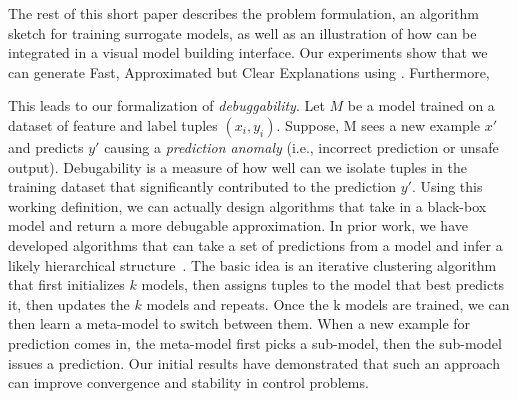 The rest of this short paper describes the \sys problem formulation, an algorithm sketch for training surrogate models, as well as an illustration of how \sys can be integrated in a visual model building interface.
Our experiments show that we can generate Fast, Approximated but Clear Explanations using \sys.
Furthermore, 


This leads to our formalization of \emph{debuggability}.
Let $M$ be a model trained on a dataset of feature and label tuples $(x_i,y_i)$.
Suppose, M sees a new example $x'$ and predicts $y'$ causing a \emph{prediction anomaly} (i.e., incorrect prediction or unsafe output).
Debugability is a measure of how well can we isolate tuples in the training dataset that significantly contributed to the prediction $y'$.
Using this working definition, we can actually design algorithms that take in a black-box model and return a more debugable approximation.
In prior work, we have developed algorithms that can take a set of predictions from a model and infer a likely hierarchical structure~\cite{DBLP:journals/corr/KrishnanGLMPG16, Krishnan17}.
The basic idea is an iterative clustering algorithm that first initializes $k$ models, then assigns tuples to the model that best predicts it, then updates the $k$ models and repeats.
Once the k models are trained, we can then learn a meta-model to switch between them.
When a new example for prediction comes in, the meta-model first picks a sub-model, then the sub-model issues a prediction.
Our initial results have demonstrated that such an approach can improve convergence and stability in control problems.
\fi




























